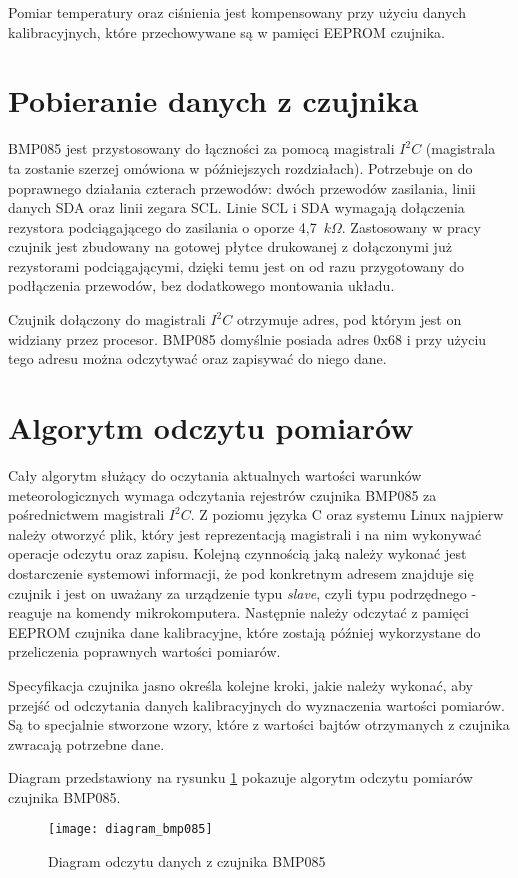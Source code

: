 Pomiar temperatury oraz ciśnienia jest kompensowany przy użyciu danych kalibracyjnych, które przechowywane są w pamięci EEPROM czujnika.

\section*{Pobieranie danych z czujnika}
BMP085 jest przystosowany do łączności za pomocą magistrali $I^2C$ (magistrala ta zostanie szerzej omówiona w późniejszych rozdziałach). Potrzebuje on do poprawnego działania czterach przewodów: dwóch przewodów zasilania, linii danych SDA oraz linii zegara SCL. Linie SCL i SDA wymagają dołączenia rezystora podciągającego do zasilania o oporze 4,7~$k\Omega$. Zastosowany w pracy czujnik jest zbudowany na gotowej płytce drukowanej z dołączonymi już rezystorami podciągającymi, dzięki temu jest on od razu przygotowany do podłączenia przewodów, bez dodatkowego montowania układu.

Czujnik dołączony do magistrali $I^2C$ otrzymuje adres, pod którym jest on widziany przez procesor. BMP085 domyślnie posiada adres 0x68 i przy użyciu tego adresu można odczytywać oraz zapisywać do niego dane.

\section*{Algorytm odczytu pomiarów}
Cały algorytm służący do oczytania aktualnych wartości warunków meteorologicznych wymaga odczytania rejestrów czujnika BMP085 za pośrednictwem magistrali $I^2C$. Z poziomu języka C oraz systemu Linux najpierw należy otworzyć plik, który jest reprezentacją magistrali i na nim wykonywać operacje odczytu oraz zapisu. Kolejną czynnością jaką należy wykonać jest dostarczenie systemowi informacji, że pod konkretnym adresem znajduje się czujnik i jest on uważany za urządzenie typu \emph{slave}, czyli typu podrzędnego - reaguje na komendy mikrokomputera. Następnie należy odczytać z pamięci EEPROM czujnika dane kalibracyjne, które zostają później wykorzystane do przeliczenia poprawnych wartości pomiarów.

Specyfikacja czujnika jasno określa kolejne kroki, jakie należy wykonać, aby przejść od odczytania danych kalibracyjnych do wyznaczenia wartości pomiarów. Są to specjalnie stworzone wzory, które z wartości bajtów otrzymanych z czujnika zwracają potrzebne dane.

Diagram przedstawiony na rysunku \ref{fig:diagram_bmp085} pokazuje algorytm odczytu pomiarów czujnika BMP085.

\begin{figure}[h]
\centering
\texttt{[image: diagram\_bmp085]}
\caption{Diagram odczytu danych z czujnika BMP085}
\label{fig:diagram_bmp085}
\end{figure}